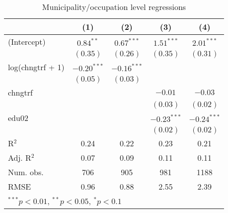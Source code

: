 
\begin{table}
\caption{Municipality/occupation level regressions}
\begin{center}
\begin{tabular}{l c c c c }
\hline
 & (1) & (2) & (3) & (4) \\
\hline
(Intercept)      & $0.84^{**}$   & $0.67^{***}$  & $1.51^{***}$  & $2.01^{***}$  \\
                 & $(0.35)$      & $(0.26)$      & $(0.35)$      & $(0.31)$      \\
log(chngtrf + 1) & $-0.20^{***}$ & $-0.16^{***}$ &               &               \\
                 & $(0.05)$      & $(0.03)$      &               &               \\
chngtrf          &               &               & $-0.01$       & $-0.03$       \\
                 &               &               & $(0.03)$      & $(0.02)$      \\
edu02            &               &               & $-0.23^{***}$ & $-0.24^{***}$ \\
                 &               &               & $(0.02)$      & $(0.02)$      \\
\hline
R$^2$            & 0.24          & 0.22          & 0.23          & 0.21          \\
Adj. R$^2$       & 0.07          & 0.09          & 0.11          & 0.11          \\
Num. obs.        & 706           & 905           & 981           & 1188          \\
RMSE             & 0.96          & 0.88          & 2.55          & 2.39          \\
\hline
\multicolumn{5}{l}{\scriptsize{$^{***}p<0.01$, $^{**}p<0.05$, $^*p<0.1$}}
\end{tabular}
\label{table:coefficients}
\end{center}
\end{table}
